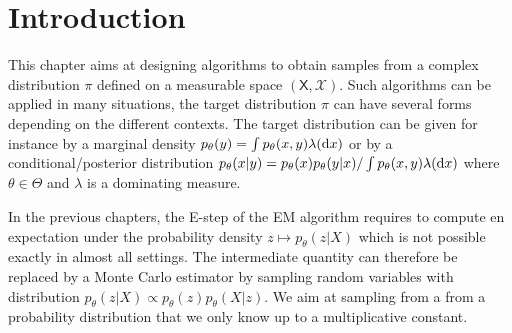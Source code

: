 \documentclass[english,graybox,envcountchap,envcountsame,sectrefs,shortlabels]{svmono}
\theoremstyle{style}
\begin{document}
\section{Introduction}
This chapter aims at designing algorithms to obtain samples from a complex distribution $\pi$ defined on a measurable space $(\mathsf{X},\mathcal{X})$. Such algorithms can be applied in many situations, the target distribution $\pi$ can have several forms depending on the different contexts. The target distribution can be given for instance by a marginal density $p_\theta(y) = \int p_\theta(x,y) \lambda(\mathrm{d} x)$ or by a conditional/posterior distribution $p_\theta(x|y) = p_\theta(x)p_\theta(y|x)/\int p_\theta(x,y) \lambda(\mathrm{d} x)$ where $\theta\in\Theta$ and $\lambda$ is a dominating measure.

In the previous chapters, the E-step of the EM algorithm requires to compute en expectation under the probability density $z \mapsto p_\theta(z|X)$ which is not possible exactly in almost all settings. The intermediate quantity  can therefore be replaced by a Monte Carlo  estimator by sampling random variables with distribution $p_\theta(z|X)\propto p_\theta(z)p_\theta(X|z)$. We aim at sampling from a from a probability distribution that we only know up to a multiplicative constant.

\end{document}
